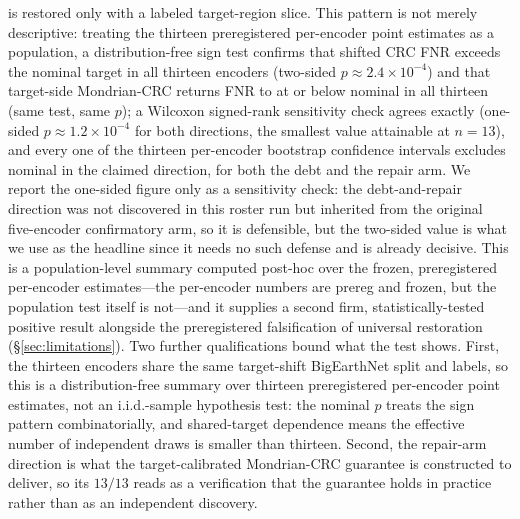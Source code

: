 \documentclass[journal]{IEEEtran}
\renewcommand{\_}{\textunderscore\allowbreak}
\begin{document}
is restored only with a labeled target-region slice.
This pattern is not merely descriptive: treating the thirteen preregistered per-encoder point estimates
as a population, a distribution-free sign test confirms that shifted CRC FNR exceeds the nominal target
in all thirteen encoders (two-sided $p\approx2.4\times10^{-4}$) and that target-side Mondrian-CRC returns
FNR to at or below nominal in all thirteen (same test, same $p$); a Wilcoxon signed-rank sensitivity
check agrees exactly (one-sided $p\approx1.2\times10^{-4}$ for both directions, the smallest value
attainable at $n{=}13$), and every one of the thirteen per-encoder bootstrap confidence intervals
excludes nominal in the claimed direction, for both the debt and the repair arm. We report the
one-sided figure only as a sensitivity check: the debt-and-repair direction was not discovered in this
roster run but inherited from the original five-encoder confirmatory arm, so it is defensible, but the
two-sided value is what we use as the headline since it needs no such defense and is already decisive.
This is a population-level summary computed post-hoc over the frozen, preregistered per-encoder
estimates---the per-encoder numbers are prereg and frozen, but the population test itself is not---and
it supplies a second firm, statistically-tested positive result alongside the preregistered
falsification of universal restoration (\S\ref{sec:limitations}). Two further qualifications
bound what the test shows. First, the thirteen encoders share the same target-shift
BigEarthNet split and labels, so this is a distribution-free summary over thirteen
preregistered per-encoder point estimates, not an i.i.d.-sample hypothesis test: the nominal
$p$ treats the sign pattern combinatorially, and shared-target dependence means the effective
number of independent draws is smaller than thirteen. Second, the repair-arm direction is what
the target-calibrated Mondrian-CRC guarantee is constructed to deliver, so its $13/13$ reads
as a verification that the guarantee holds in practice rather than as an independent discovery.
\end{document}
